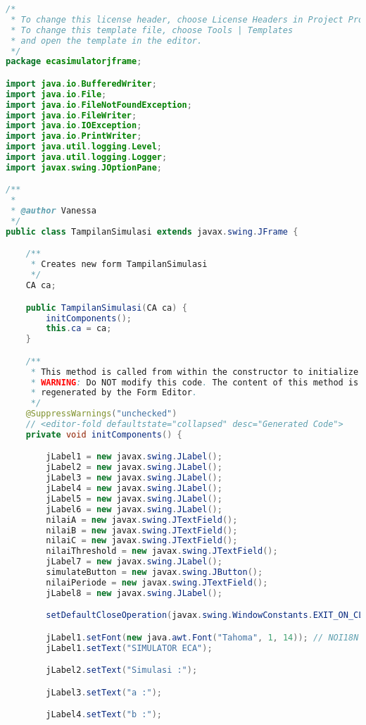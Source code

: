 \begin{lstlisting}[language=Java, caption=Entrepreneurs.java]
/*
 * To change this license header, choose License Headers in Project Properties.
 * To change this template file, choose Tools | Templates
 * and open the template in the editor.
 */
package ecasimulatorjframe;

import java.io.BufferedWriter;
import java.io.File;
import java.io.FileNotFoundException;
import java.io.FileWriter;
import java.io.IOException;
import java.io.PrintWriter;
import java.util.logging.Level;
import java.util.logging.Logger;
import javax.swing.JOptionPane;

/**
 *
 * @author Vanessa
 */
public class TampilanSimulasi extends javax.swing.JFrame {

    /**
     * Creates new form TampilanSimulasi
     */
    CA ca;

    public TampilanSimulasi(CA ca) {
        initComponents();
        this.ca = ca;
    }

    /**
     * This method is called from within the constructor to initialize the form.
     * WARNING: Do NOT modify this code. The content of this method is always
     * regenerated by the Form Editor.
     */
    @SuppressWarnings("unchecked")
    // <editor-fold defaultstate="collapsed" desc="Generated Code">                          
    private void initComponents() {

        jLabel1 = new javax.swing.JLabel();
        jLabel2 = new javax.swing.JLabel();
        jLabel3 = new javax.swing.JLabel();
        jLabel4 = new javax.swing.JLabel();
        jLabel5 = new javax.swing.JLabel();
        jLabel6 = new javax.swing.JLabel();
        nilaiA = new javax.swing.JTextField();
        nilaiB = new javax.swing.JTextField();
        nilaiC = new javax.swing.JTextField();
        nilaiThreshold = new javax.swing.JTextField();
        jLabel7 = new javax.swing.JLabel();
        simulateButton = new javax.swing.JButton();
        nilaiPeriode = new javax.swing.JTextField();
        jLabel8 = new javax.swing.JLabel();

        setDefaultCloseOperation(javax.swing.WindowConstants.EXIT_ON_CLOSE);

        jLabel1.setFont(new java.awt.Font("Tahoma", 1, 14)); // NOI18N
        jLabel1.setText("SIMULATOR ECA");

        jLabel2.setText("Simulasi :");

        jLabel3.setText("a :");

        jLabel4.setText("b :");


\end{lstlisting}
